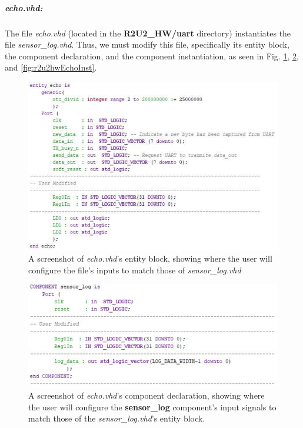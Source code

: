\subparagraph{echo.vhd:} The file \textit{echo.vhd} (located in the \textbf{R2U2\_HW/uart} directory) instantiates the file \textit{sensor\_log.vhd}. Thus, we must modify this file, specifically its entity block, the component declaration, and the component instantiation, as seen in Fig. \ref{fig:r2u2hwEchoEnt}, \ref{fig:r2u2hwEchoCom}, and \ref{fig:r2u2hwEchoInst}.

\begin{figure}[H]
	\begin{center}
	\includegraphics[scale=0.5]{fig/r2u2_hw_echo_entity.pdf}
	\caption{A screenshot of \textit{echo.vhd}'s entity block, showing where the user will configure the file's inputs to match those of \textit{sensor\_log.vhd}
	\label{fig:r2u2hwEchoEnt}} 
	\end{center}
\end{figure}

\begin{figure}[H]
	\begin{center}
	\includegraphics[scale=0.5]{fig/r2u2_hw_echo_component.pdf}
	\caption{A screenshot of \textit{echo.vhd}'s component declaration, showing where the user will configure the \textbf{sensor\_log} component's input signals to match those of the \textit{sensor\_log.vhd}'s entity block.
	\label{fig:r2u2hwEchoCom}} 
	\end{center}
\end{figure}

